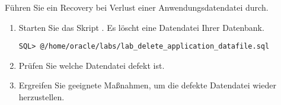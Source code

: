     \item Führen Sie ein Recovery bei Verlust einer Anwendungsdatendatei durch.
      \begin{enumerate}
        \item Starten Sie das Skript . Es löscht eine Datendatei Ihrer Datenbank.
          \begin{lstlisting}[language=terminal]
SQL> @/home/oracle/labs/lab_delete_application_datafile.sql
          \end{lstlisting}
        \item Prüfen Sie welche Datendatei defekt ist.
        \item Ergreifen Sie geeignete Maßnahmen, um die defekte Datendatei wieder herzustellen.
      \end{enumerate}
